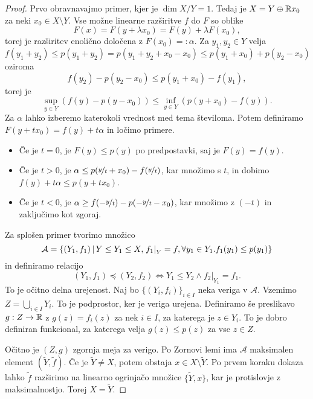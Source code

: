\begin{proof}
  Prvo obravnavajmo primer, kjer je $\dim X/Y = 1$.
  Tedaj je $X = Y \oplus \mathbb{R} x_0$ za neki $x_0 \in X \setminus Y$.
  Vse možne linearne razširitve $f$ do $F$ so oblike
  \[
	F(x) = F(y + \lambda x_0) = F(y) + \lambda F(x_0),
  \]
  torej je razširitev enolično določena z $F(x_0) =: \alpha$.
  Za $y_1, y_2 \in Y$ velja
  \[
	f(y_1 + y_2) \le p(y_1 + y_2) = p(y_1 + y_2 + x_0 - x_0)
	\le p(y_1 + x_0) + p(y_2 - x_0)
  \]
  oziroma
  \[
	f(y_2) - p(y_2 - x_0) \le p(y_1 + x_0) - f(y_1),
  \]
  torej je
  \[
	\sup_{y \in Y} \left( f(y) - p(y - x_0) \right)
	\le \inf_{y \in Y} \left( p(y + x_0) - f(y) \right).
  \]
  Za $\alpha$ lahko izberemo katerokoli vrednost med tema številoma.
  Potem definiramo $F(y + t x_0) = f(y) + t \alpha$ in ločimo primere.
  \begin{itemize}
  \item Če je $t = 0$, je $F(y) \le p(y)$ po predpostavki, saj je $F(y) = f(y)$.
  \item Če je $t > 0$, je $\alpha \le p(\nicefrac{y}{t} + x_0) -
	f(\nicefrac{y}{t})$, kar množimo s $t$, in dobimo $f(y) + t \alpha \le p(y +
	t x_0)$.
  \item Če je $t < 0$, je $\alpha \ge f(-\nicefrac{y}{t}) - p(-\nicefrac{y}{t} -
	x_0)$, kar množimo z $(-t)$ in zaključimo kot zgoraj.
  \end{itemize}

  Za splošen primer tvorimo množico
  \[
	\mathcal{A} = \{
	(Y_1, f_1) \,|\, Y \le Y_1 \le X, \left. f_1 \right|_Y = f,
	\forall y_1 \in Y_1 . f_1(y_1) \le p(y_1)
	\}
  \]
  in definiramo relacijo
  \[
	(Y_1, f_1) \preccurlyeq (Y_2, f_2) \iff Y_1 \le Y_2 \land \left. f_2
	\right|_{Y_1} = f_1.
  \]
  To je očitno delna urejenost.
  Naj bo $\{(Y_i, f_i)\}_{i \in I}$ neka veriga v $\mathcal{A}$.
  Vzemimo $Z = \bigcup_{i \in I} Y_i$.
  To je podprostor, ker je veriga urejena.
  Definiramo še preslikavo $g: Z \to \mathbb{R}$ z $g(z) = f_i(z)$ za nek $i \in I$, za
  katerega je $z \in Y_i$.
  To je dobro definiran funkcional, za katerega velja $g(z) \le p(z)$ za vse $z
  \in Z$.

  Očitno je $(Z, g)$ zgornja meja za verigo.
  Po Zornovi lemi ima $\mathcal{A}$ maksimalen element $(\tilde{Y}, \tilde{f})$.
  Če je $\tilde{Y} \ne X$, potem obstaja $x \in X \setminus \tilde{Y}$.
  Po prvem koraku dokaza lahko $\tilde{f}$ razširimo na linearno ogrinjačo
  množice $\{\tilde{Y}, x\}$, kar je protislovje z maksimalnostjo.
  Torej $X = \tilde{Y}$.
\end{proof}

